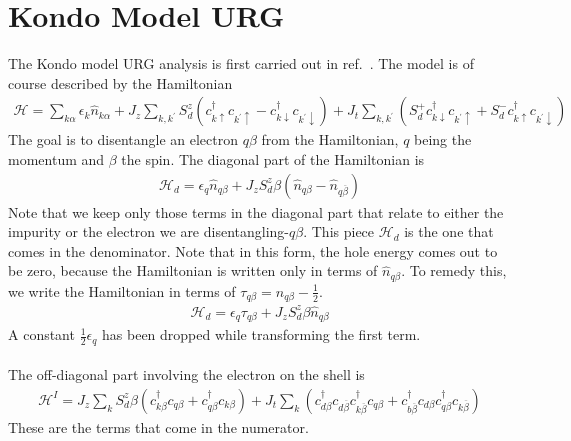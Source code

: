 \documentclass[twoside,11pt]{report}
\numberwithin{equation}{section}
\begin{document}
\section{Kondo Model URG}
\label{kondourg}
The Kondo model URG analysis is first carried out in ref.~\cite{am_thesis}. The model is of course described by the Hamiltonian
\begin{equation}\begin{aligned}
	\mathcal{H} = \sum_{k\alpha}\epsilon_{k}\hat n_{k\alpha} + J_z\sum_{k,k^\prime} S_d^z\left(c^\dagger_{k\uparrow}c_{k^\prime\uparrow} - c^\dagger_{k\downarrow}c_{k^\prime\downarrow}\right) + J_t\sum_{k,k^\prime}\left(S_d^+ c^\dagger_{k\downarrow}c_{k^\prime\uparrow} + S_d^- c^\dagger_{k\uparrow}c_{k^\prime\downarrow}\right)
\end{aligned}\end{equation}
The goal is to disentangle an electron \(q\beta\) from the Hamiltonian, \(q\) being the momentum and \(\beta\) the spin. The diagonal part of the Hamiltonian is
\begin{equation}\begin{aligned}
	\mathcal{H}_d = \epsilon_q \hat n_{q\beta} + J_z S_d^z \beta\left(\hat n_{q\beta} - \hat n_{q\overline\beta}\right)
\end{aligned}\end{equation}
Note that we keep only those terms in the diagonal part that relate to either the impurity or the electron we are disentangling-\(q\beta\). This piece \(\mathcal{H}_d\) is the one that comes in the denominator. Note that in this form, the hole energy comes out to be zero, because the Hamiltonian is written only in terms of \(\hat n_{q\beta}\). To remedy this, we write the Hamiltonian in terms of \(\tau_{q\beta} = \hat n_{q\beta} - \frac{1}{2}\).
\begin{equation}\begin{aligned}
	\label{kondodiag}
\mathcal{H}_d = \epsilon_q \tau_{q\beta} + J_z S_d^z \beta \hat n_{q\beta}
\end{aligned}\end{equation}
A constant \(\frac{1}{2} \epsilon_q\) has been dropped while transforming the first term.
\\\\The off-diagonal part involving the electron on the shell is
\begin{equation}\begin{aligned}
	\mathcal{H}^I = J_z\sum_{k}S^z_d\beta\left(c^\dagger_{k\beta}c_{q\beta} +  c^\dagger_{q\beta}c_{k\beta}\right) + J_t \sum_{k}\left(c^\dagger_{d\beta}c_{d\overline\beta} c^\dagger_{k\overline\beta}c_{q\beta} + c^\dagger_{b\overline\beta}c_{d\beta} c^\dagger_{q\beta}c_{k\overline\beta}\right)
\end{aligned}\end{equation}
These are the terms that come in the numerator.
\end{document}
